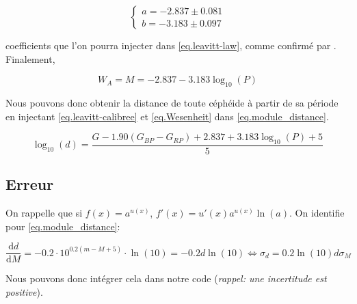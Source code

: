 \documentclass[12pt,a4paper,french]{scrartcl}
\begin{document}
\begin{equation}\label{eq.cepheid-constants} %
    \begin{cases*}
        a=-2.837 \pm 0.081\\
        b=-3.183 \pm 0.097
    \end{cases*}
\end{equation}

coefficients que l'on pourra injecter dans \cref{eq.leavitt-law}, comme confirmé par \citet[\'Equation~7]{Ripepi_datapaper}.
Finalement,

\begin{equation}\label{eq.leavitt-calibree}
    W_A=M=-2.837-3.183\log_{10}(P)
\end{equation}

Nous pouvons donc obtenir la distance de toute céphéide à partir de sa période en injectant \cref{eq.leavitt-calibree} et \cref{eq.Wesenheit} dans \cref{eq.module_distance}.

\begin{equation}\label{eq.full-cepheid}
    \boxed{
        \log_{10}(d) = \frac{G-1.90(G_{BP}-G_{RP})+2.837+3.183\log_{10}(P)+5}{5}}
\end{equation}

\subsection{Erreur}
On rappelle que si $f(x)=a^{u(x)}$, $f'(x)=u'(x)a^{u(x)}\ln(a)$. On identifie pour \cref{eq.module_distance}:

\begin{equation}\label{eq.error-cepheid}
    \frac{\mathrm{d} d}{\mathrm{d} M}
    = -0.2\cdot 10^{0.2(m-M+5)}\cdot \ln(10)
    =-0.2d\ln(10)
    \Longleftrightarrow \boxed{\sigma_d=0.2\ln(10)d\sigma_M}
\end{equation}

Nous pouvons donc intégrer cela dans notre code ({\itshape rappel: une incertitude est positive}).
\end{document}

